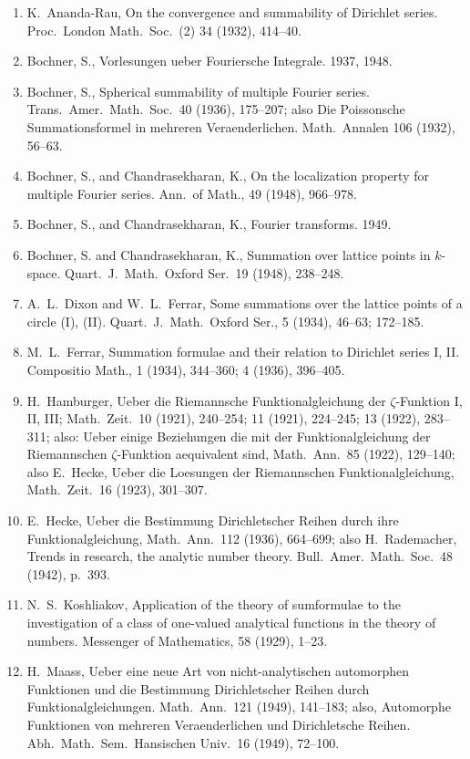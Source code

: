 \documentclass[12pt]{article}
\begin{document}
\begin{enumerate}
\item K.~Ananda-Rau, On the convergence and summability of Dirichlet series. Proc.~London Math.~Soc.~(2) 34 (1932), 414–40.
\item Bochner, S., Vorlesungen ueber Fouriersche Integrale. 1937, 1948.
\item Bochner, S., Spherical summability of multiple Fourier series. Trans.~Amer.~Math.~Soc.~40 (1936), 175–207; also Die Poissonsche Summationsformel in mehreren Veraenderlichen. Math.~Annalen 106 (1932), 56–63.
\item Bochner, S., and Chandrasekharan, K., On the localization property for multiple Fourier series. Ann.~of Math., 49 (1948), 966–978.
\item Bochner, S., and Chandrasekharan, K., Fourier transforms. 1949.
\item Bochner, S. and Chandrasekharan, K., Summation over lattice points in \(k\)-space. Quart.~J.~Math.~Oxford Ser.~19 (1948), 238–248.
\item A.~L.~Dixon and W.~L.~Ferrar, Some summations over the lattice points of a circle (I), (II). Quart.~J.~Math.~Oxford Ser., 5 (1934), 46–63; 172–185.
\item M.~L.~Ferrar, Summation formulae and their relation to Dirichlet series I, II. Compositio Math., 1 (1934), 344–360; 4 (1936), 396–405.
\item H.~Hamburger, Ueber die Riemannsche Funktionalgleichung der \(\zeta\)-Funktion I, II, III; Math.~Zeit.~10 (1921), 240–254; 11 (1921), 224–245; 13 (1922), 283–311; also: Ueber einige Beziehungen die mit der Funktionalgleichung der Riemannschen \(\zeta\)-Funktion aequivalent sind, Math.~Ann.~85 (1922), 129–140; also E.~Hecke, Ueber die Loesungen der Riemannschen Funktionalgleichung, Math.~Zeit.~16 (1923), 301–307.
\item E.~Hecke, Ueber die Bestimmung Dirichletscher Reihen durch ihre Funktionalgleichung, Math.~Ann.~112 (1936), 664–699; also H.~Rademacher, Trends in research, the analytic number theory. Bull.~Amer.~Math.~Soc.~48 (1942), p.~393.
\item N.~S.~Koshliakov, Application of the theory of sumformulae to the investigation of a class of one-valued analytical functions in the theory of numbers. Messenger of Mathematics, 58 (1929), 1–23.
\item H.~Maass, Ueber eine neue Art von nicht-analytischen automorphen Funktionen und die Bestimmung Dirichletscher Reihen durch Funktionalgleichungen. Math.~Ann.~121 (1949), 141–183; also, Automorphe Funktionen von mehreren Veraenderlichen und Dirichletsche Reihen. Abh.~Math.~Sem.~Hansischen Univ.~16 (1949), 72–100.

\end{enumerate}
\end{document}

